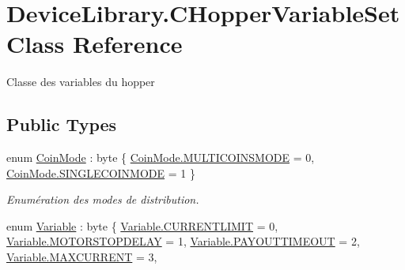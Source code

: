 \hypertarget{class_device_library_1_1_c_hopper_variable_set}{}\section{Device\+Library.\+C\+Hopper\+Variable\+Set Class Reference}
\label{class_device_library_1_1_c_hopper_variable_set}


Classe des variables du hopper  


\subsection*{Public Types}
\begin{DoxyCompactItemize}
\item 
enum \mbox{\hyperlink{class_device_library_1_1_c_hopper_variable_set_a6d46e753370657ed1e4f4ab7bea0dacf}{Coin\+Mode}} \+: byte \{ \mbox{\hyperlink{class_device_library_1_1_c_hopper_variable_set_a6d46e753370657ed1e4f4ab7bea0dacfa5dd17b223b1713eff15e96575133d991}{Coin\+Mode.\+M\+U\+L\+T\+I\+C\+O\+I\+N\+S\+M\+O\+DE}} = 0, 
\mbox{\hyperlink{class_device_library_1_1_c_hopper_variable_set_a6d46e753370657ed1e4f4ab7bea0dacfad989518c433e0f8cd3d13553971ae26d}{Coin\+Mode.\+S\+I\+N\+G\+L\+E\+C\+O\+I\+N\+M\+O\+DE}} = 1
 \}
\begin{DoxyCompactList}\small\item\em Enumération des modes de distribution. \end{DoxyCompactList}\item 
enum \mbox{\hyperlink{class_device_library_1_1_c_hopper_variable_set_a3b79d051f89692abb5d34ae3f4e946be}{Variable}} \+: byte \{ \newline
\mbox{\hyperlink{class_device_library_1_1_c_hopper_variable_set_a3b79d051f89692abb5d34ae3f4e946bea4813867da2e7cbfd225e950893f2063b}{Variable.\+C\+U\+R\+R\+E\+N\+T\+L\+I\+M\+IT}} = 0, 
\mbox{\hyperlink{class_device_library_1_1_c_hopper_variable_set_a3b79d051f89692abb5d34ae3f4e946bea07f83719bd6b4fbe57de5df0adcd6040}{Variable.\+M\+O\+T\+O\+R\+S\+T\+O\+P\+D\+E\+L\+AY}} = 1, 
\mbox{\hyperlink{class_device_library_1_1_c_hopper_variable_set_a3b79d051f89692abb5d34ae3f4e946bea2ce47c5981a3b2d40b2dea2bcc857dfe}{Variable.\+P\+A\+Y\+O\+U\+T\+T\+I\+M\+E\+O\+UT}} = 2, 
\mbox{\hyperlink{class_device_library_1_1_c_hopper_variable_set_a3b79d051f89692abb5d34ae3f4e946bea07eaaced542a660738d0b539a58d1b51}{Variable.\+M\+A\+X\+C\+U\+R\+R\+E\+NT}} = 3, 
\newline

\end{DoxyCompactItemize}
